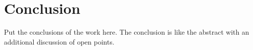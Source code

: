 \documentclass[journal]{IEEEtran}
\begin{document}
%


\section{Conclusion}
Put the conclusions of the work here. The conclusion is like the abstract with
an additional discussion of open points.


%
\end{document}
